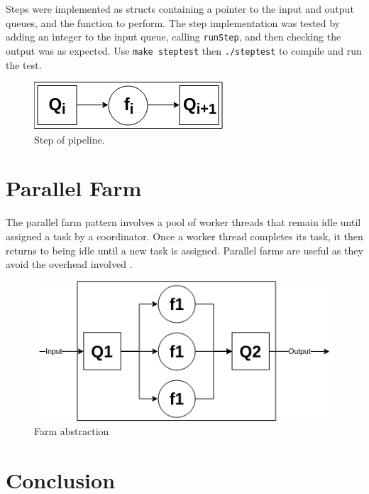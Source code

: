 \documentclass[12pt]{article}
\def\code#1{\texttt{#1}}
\begin{document}
Steps were implemented as structs containing a pointer to the input and output queues, and the function  to perform. The step implementation was tested by adding an integer to the input queue, calling \code{runStep}, and then checking the output was as expected. Use \code{make steptest} then \code{./steptest} to compile and run the test.

\begin{figure}[!ht]
	\centering 
	\includegraphics[width=0.45\linewidth]{images/step}
	\caption{Step of pipeline.}
	\label{fig:step}
\end{figure}

\section{Parallel Farm}

The parallel farm pattern involves a pool of worker threads that remain idle until assigned a task by a coordinator. Once a worker thread completes its task, it then returns to being idle until a new task is assigned. Parallel farms are useful as they avoid the overhead involved .

\begin{figure}[!ht]
	\centering 
	\includegraphics[width=0.8\linewidth]{images/farm}
	\caption{Farm abstraction}
	\label{fig:farm}
\end{figure}

\section*{Conclusion}

%
%
\end{document}
